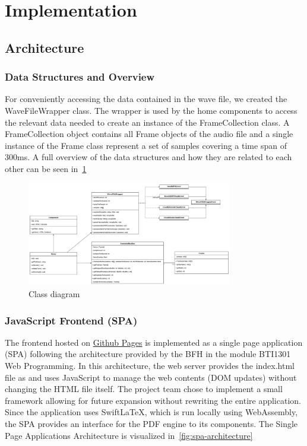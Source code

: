 \section{Implementation}\label{sec:implementation}

\subsection{Architecture}\label{subsec:architecture}

\subsubsection{Data Structures and Overview}
For conveniently accessing the data contained in the wave file, we created the WaveFileWrapper class.
The wrapper is used by the home components to access the relevant data needed to create an instance of the FrameCollection class.
A FrameCollection object contains all Frame objects of the audio file and a single instance of the Frame class represent a set of samples covering a time span of 300ms.
A full overview of the data structures and how they are related to each other can be seen in~\ref{fig:class-diagram}

\begin{figure}[H]
    \centering
    \includegraphics[width=0.8\textwidth]{../assets/class_diagram.png}
    \caption{Class diagram}\label{fig:class-diagram}
\end{figure}

\subsubsection{JavaScript Frontend (SPA)}
The frontend hosted on \href{https://decibel-threshold-event-displayer.github.io/}{Github Pages} is implemented as a single page application (SPA) following the architecture provided by the BFH in the module BTI1301 Web Programming.
In this architecture, the web server provides the index.html file as and uses JavaScript to manage the web contents (DOM updates) without changing the HTML file itself.
The project team chose to implement a small framework allowing for future expansion without rewriting the entire application.
Since the application uses SwiftLaTeX, which is run locally using WebAssembly, the SPA provides an interface for the PDF engine to its components.
The Single Page Applications Architecture is visualized in~\ref{fig:spa-architecture}

